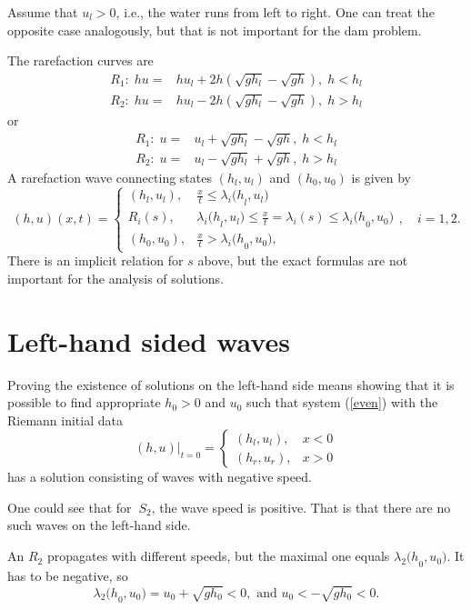 \documentclass{article}
\theoremstyle{plain}
\theoremstyle{definition}
\theoremstyle{remark}
\begin{document}
Assume that \(u_{l} > 0\), i.e., the water runs from left to right.
One can treat the opposite case analogously, but that is not important for
the dam problem.

The rarefaction curves are 
\[ 
\begin{split} 
R_{1}:\;   hu =  & hu_{l} + 2h\left( \sqrt{gh_{l}} - \sqrt{gh} \right),\;
h<h_{l} \\
R_{2}:\;  hu = & hu_{l} - 2h\left( \sqrt{gh_{l}} - \sqrt{gh} \right),\; 
h>h_{l} 
\end{split} 
\]
or
\[ 
\begin{split} 
R_{1}:\; u = & u_{l} + \sqrt{gh_{l}} - \sqrt{gh},\; h<h_{l} \\
R_{2}:\; u = & u_{l} - \sqrt{gh_{l}} + \sqrt{gh},\; h>h_{l} 
\end{split} 
\]
A rarefaction wave connecting states $(h_{l},u_{l})$ and 
$(h_0,u_0)$ is given by 
\[
(h,u)(x,t) = \begin{cases}
(h_{l},u_{l}), & \frac{x}{t} \leq \lambda_{i}{(h}_{l},u_{l}) \\
R_{i}(s), & \lambda_{i}{(h}_{l},u_{l}) \leq \frac{x}{t} = \lambda_{i}(s)
\leq \lambda_{i}{(h}_{0},u_{0}) \\
(h_{0},u_{0}), & \frac{x}{t} > \lambda_{i}{(h}_{0},u_{0}),

\end{cases} ,\quad i=1,2.
\]
There is an implicit relation for $s$ above, but
the exact formulas are not important 
for the analysis of solutions.

\section{Left-hand sided waves}

Proving the existence of solutions on the left-hand side 
means showing that it is 
possible to find appropriate $h_{0}>0$ and $u_{0}$ such that 
system (\ref{even}) with the Riemann initial data
\[
(h,u)|_{t=0} = \begin{cases}
(h_{l},u_{l}), & x < 0 \\
(h_{r},u_{r}), & x > 0 
\end{cases}
\]
has a solution consisting of waves with negative speed.

One could see that for \(\ S_{2}\), the wave speed is positive. That
is that there are no such waves on the left-hand side.

An \(R_{2}\) propagates with different speeds, but the maximal one equals
\(\lambda_{2}{(h}_{0},u_{0})\). It has to be negative, so
\begin{equation} \label{r2r}
\lambda_{2}{(h}_{0},u_{0}) = u_{0} + \sqrt{gh_{0}} < 0, 
\text{ and  } u_{0} < - \sqrt{gh_{0}}<0.
\end{equation}
\end{document}
